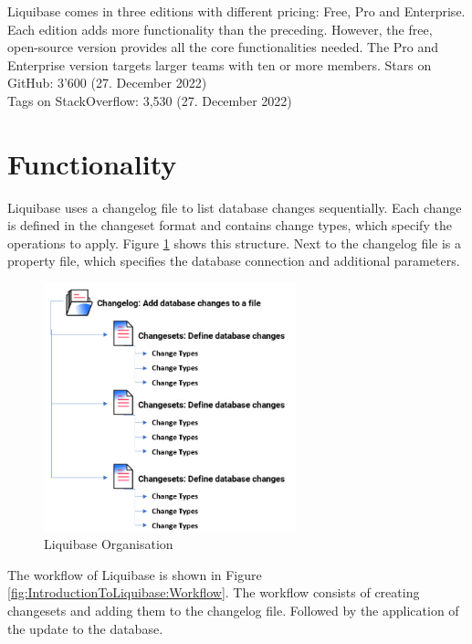 %
Liquibase \cite{Liquibase} comes in three editions with different pricing: Free, Pro and Enterprise. Each edition adds more functionality than the preceding. However, the free, open-source version provides all the core functionalities needed. The Pro and Enterprise version targets larger teams with ten or more members. 
\newpage
{}%
Stars on GitHub: 3'600 (27. December 2022)\\
Tags on StackOverflow: 3,530 (27. December 2022)\\

\section{Functionality}
%
Liquibase uses a changelog file to list database changes sequentially. Each change is defined in the changeset format and contains change types, which specify the operations to apply. Figure \ref{fig:IntroductionToLiquibase:LiquibaseChangelogStructure} shows this structure. Next to the changelog file is a property file, which specifies the database connection and additional parameters.

\begin{figure}[H]
	\centering
	\includegraphics[width=0.65\textwidth]{./chapters/intro_liquibase/images/changelog-structure.png}
	\caption[Liquibase Organisation - Source: \cite{Liquibase}]{Liquibase Organisation}
	\label{fig:IntroductionToLiquibase:LiquibaseChangelogStructure}
\end{figure}

The workflow of Liquibase is shown in Figure \ref{fig:IntroductionToLiquibase:Workflow}. The workflow consists of creating changesets and adding them to the changelog file. Followed by the application of the update to the database. 

